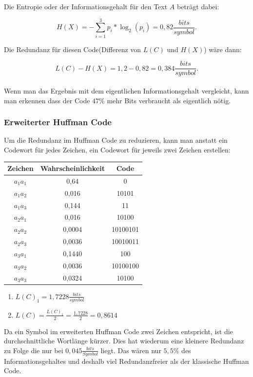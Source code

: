 \documentclass{article}
\begin{document}
Die Entropie\cite{noauthor_entropie_2019} oder der Informationsgehalt für den Text $A$ beträgt dabei:

\[
    H(X) = -\sum_{i=1}^{3} p_i * \log_2(p_i) = 0,82 \frac{bits}{symbol}
.\]

Die Redundanz für diesen Code(Differenz von $L(C)$ und $H(X)$) wäre dann:

\[
    L(C) - H(X) = 1,2 - 0,82 = 0,384 \frac{bits}{symbol}
.\]\\
Wenn man das Ergebnis mit dem eigentlichen Informationsgehalt vergleicht, kann man erkennen
dass der Code $47\%$ mehr Bits verbraucht als eigentlich nötig.

\subsubsection{Erweiterter Huffman Code}

Um die Redundanz im Huffman Code zu reduzieren, kann man anstatt ein Codewort für jedes Zeichen, ein Codewort für jeweils zwei Zeichen erstellen:

\begin{table}[htpb]
    \centering
    \begin{tabular}{|c c c|} 
        \hline
        Zeichen & Wahrscheinlichkeit & Code\\
        \hline\hline
        $a_1a_1$ & 0,64 & 0\\
        \hline\hline
        $a_1a_2$ & 0,016 & 10101\\
        \hline\hline
        $a_1a_3$ & 0,144 & 11\\
        \hline\hline
        $a_2a_1$ & 0,016 & 10100\\
        \hline\hline
        $a_2a_2$ & 0,0004 & 10100101\\
        \hline\hline
        $a_2a_3$ & 0,0036 & 10010011\\
        \hline\hline
        $a_3a_1$ & 0,1440 & 100\\
        \hline\hline
        $a_3a_2$ & 0,0036 & 10100100\\
        \hline\hline
        $a_3a_3$ & 0,0324 & 10100\\
        \hline
    \end{tabular}
\end{table}

\begin{enumerate}
    \item $L(C)_1 = 1,7228 \frac{bits}{symbol} $
    \item $L(C) = \frac{L(C)_1}{2} =  \frac{1,7228}{2} = 0,8614$
\end{enumerate}\bigskip

Da ein Symbol im erweiterten Huffman Code zwei Zeichen entspricht, ist die durchschnittliche Wortlänge kürzer.
Dies hat wiederum eine kleinere Redundanz zu Folge die nur bei $0,045 \frac{bits}{Symbol}$ liegt.
Das wären nur $5,5 \%$ des Informationsgehaltes und deshalb viel Redundanzfreier als der klassische Huffman Code.

\renewcommand{\refname}{Literaturverzeichnis}


\end{document}
